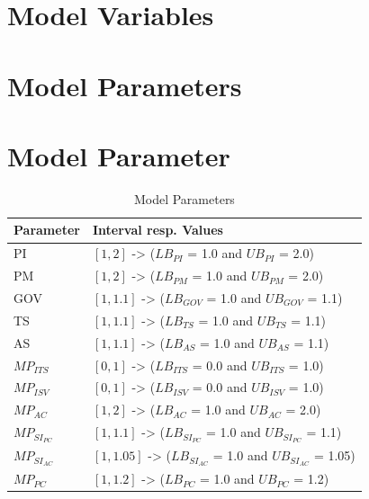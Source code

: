 \section{Model Variables}\label{ch:sfd:mv}

\section{Model Parameters}\label{ch:sfd:mp}

\newpage
\section{Model Parameter}
\begin{table}[tbh]
	\centering
	\begin{tabular}{ll}
			\toprule 
			Parameter & Interval resp. Values\\ \midrule
			PI & $[1,2]$ -> ($LB_{PI}$ = 1.0 and $UB_{PI}$ = 2.0) \\ 
			PM & $[1,2]$ -> ($LB_{PM}$ = 1.0 and $UB_{PM}$ = 2.0) \\ \midrule
			GOV & $[1,1.1]$ -> ($LB_{GOV}$ = 1.0 and $UB_{GOV}$ = 1.1) \\
			TS & $[1,1.1]$ -> ($LB_{TS}$ = 1.0 and $UB_{TS}$ = 1.1) \\
			AS & $[1,1.1]$ -> ($LB_{AS}$ = 1.0 and $UB_{AS}$ = 1.1) \\ \midrule
			$MP_{ITS}$ & $[0,1]$ -> ($LB_{ITS}$ = 0.0 and $UB_{ITS}$ = 1.0) \\
			$MP_{ISV}$ & $[0,1]$ -> ($LB_{ISV}$ = 0.0 and $UB_{ISV}$ = 1.0) \\
			$MP_{AC}$ & $[1,2]$ -> ($LB_{AC}$ = 1.0 and $UB_{AC}$ = 2.0) \\
			$MP_{SI_{PC}}$ & $[1,1.1]$ -> ($LB_{SI_{PC}}$ = 1.0 and $UB_{SI_{PC}}$ = 1.1) \\
			$MP_{SI_{AC}}$ & $[1,1.05]$ -> ($LB_{SI_{AC}}$ = 1.0 and $UB_{SI_{AC}}$ = 1.05) \\
			$MP_{PC}$ & $[1,1.2]$ -> ($LB_{PC}$ = 1.0 and $UB_{PC}$ = 1.2) \\ \bottomrule
	\end{tabular}
	\caption{Model Parameters}
	\label{tab:mpara}
\end{table}

